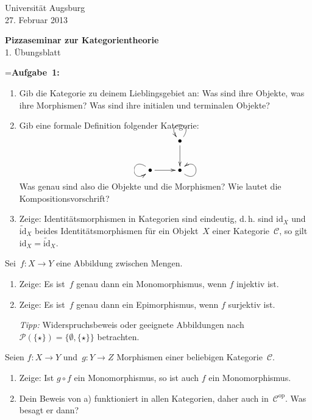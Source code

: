 \documentclass[a4paper,ngerman]{scrartcl}
\theoremstyle{definition}
\theoremstyle{plain}
\theoremstyle{remark}
\newcommand{\C}{\mathcal{C}}
\newcommand{\id}{\mathrm{id}}
\newcommand{\op}{\mathrm{op}}
\begin{document}
\vspace*{-4em}
\begin{flushright}Universität Augsburg \\ 27. Februar 2013\end{flushright}

\begin{center}\Large \textbf{Pizzaseminar zur Kategorientheorie} \\
1. Übungsblatt
\end{center}
\vspace{2em}

\newbox{\mybox}
\setbox\mybox=\hbox{\textbf{Aufgabe 1:}}

\begin{list}{}{\wd\mybox \leftmargin\wd\mybox \itemsep 1.3em}
\item[\textbf{Aufgabe 1:}]
\begin{enumerate}
\item Gib die Kategorie zu deinem Lieblingsgebiet an: Was sind ihre Objekte,
was ihre Morphismen? Was sind ihre initialen und terminalen Objekte?
\item Gib eine formale Definition folgender Kategorie:
    \vspace{0.5em}
    \[ \xymatrix{
      & \bullet \ar[d] \ar@(ur,ul) \\
      \bullet \ar[r] \ar@(ul,dl) & \bullet \ar@(dr,ur)
    } \]
Was genau sind also die Objekte und die Morphismen? Wie lautet die
Kompositionsvorschrift?
\item Zeige: Identitätsmorphismen in Kategorien sind eindeutig, d.\,h. sind
$\id_X$ und $\widetilde{\id}_X$ beides Identitätsmorphismen für ein Objekt~$X$
einer Kategorie~$\C$, so gilt~$\id_X = \widetilde{\id}_X$.
\end{enumerate}

\item[\textbf{Aufgabe 2:}]
Sei~$f:X \to Y$ eine Abbildung zwischen Mengen.
\begin{enumerate}
\item Zeige: Es ist~$f$ genau dann ein Monomorphismus, wenn $f$
injektiv ist.
\item Zeige: Es ist~$f$ genau dann ein Epimorphismus, wenn $f$
surjektiv ist.

\emph{Tipp:} Widerspruchsbeweis oder geeignete Abbildungen nach $\mathcal{P}(\{\star\})
= \{ \emptyset, \{ \star\} \}$ betrachten.
\end{enumerate}

\item[\textbf{Aufgabe 3:}]
Seien $f:X \to Y$ und~$g:Y \to Z$ Morphismen einer beliebigen Kategorie~$\C$.
\begin{enumerate}
\item Zeige: Ist $g \circ f$ ein Monomorphismus, so ist auch $f$ ein
Monomorphismus.
\item Dein Beweis von a) funktioniert in allen Kategorien, daher auch
in~$\C^\op$. Was besagt er dann?
\end{enumerate}



\end{list}
\end{document}
